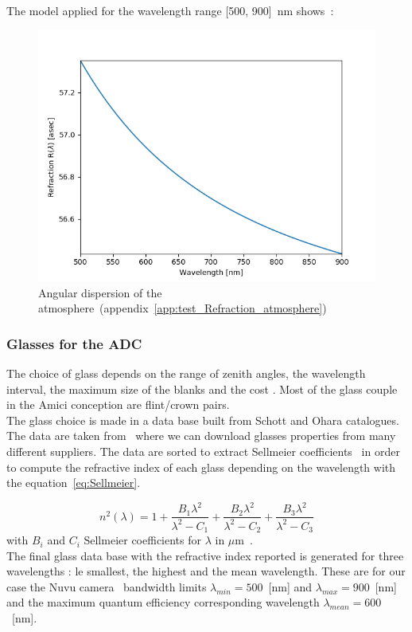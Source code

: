 The model applied for the wavelength range [500, 900]~nm shows~:
\begin{figure}[H]
\centering
	\includegraphics[width = .7\textwidth]{images/refraction_atm.png}
	\caption{Angular dispersion of the atmosphere~(appendix~\ref{app:test_Refraction_atmosphere})}\label{fig:refraction_atm}
	\centering
\end{figure}

\subsubsection{Glasses for the ADC}
The choice of glass depends on the range of zenith angles, the wavelength interval, the maximum size of the blanks and the cost \cite{WynneWors1986}. Most of the glass couple in the Amici conception are flint/crown pairs. \\
The glass choice is made in a data base built from Schott and Ohara catalogues. The data are taken from~\cite{RefIndexInfo} where we can download glasses properties from many different suppliers. The data are sorted to extract Sellmeier coefficients~\cite{SchottSellmeier} in order to compute the refractive index of each glass depending on the wavelength with the equation~\eqref{eq:Sellmeier}.

\begin{equation}
	n^2(\lambda) = 1+ \frac{B_1\lambda^2}{\lambda^2-C_1}+\frac{B_2\lambda^2}{\lambda^2-C_2}+\frac{B_3\lambda^2}{\lambda^2-C_3}\label{eq:Sellmeier}
\end{equation}
with $B_i$ and $C_i$ Sellmeier coefficients for $\lambda$ in $\mu$m~\cite{SchottSellmeier}.\\

The final glass data base with the refractive index reported is generated for three wavelengths : le smallest, the highest and the mean wavelength. These are for our case the Nuvu camera~\cite{NuvuQE} bandwidth limits $\lambda_{min} = 500$~[nm] and $\lambda_{max} = 900$~[nm] and the maximum quantum efficiency corresponding wavelength $\lambda_{mean} = 600$~[nm].



